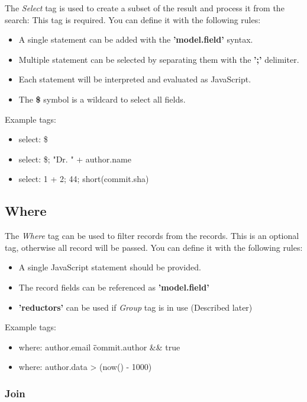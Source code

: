 The \textit{Select} tag is used to create a subset of the result and process it from the search:
This tag is required.
You can define it with the following rules:

\begin{itemize}
	\item A single statement can be added with the \textbf{'{model}.{field}'} syntax.
	\item Multiple statement can be selected by separating them with the \textbf{';'} delimiter.
	\item Each statement will be interpreted and evaluated as JavaScript.
	\item The \textbf{\$} symbol is a wildcard to select all fields. 
\end{itemize}

Example tags:
\begin{itemize}
	\item select: \$
	\item select: \$; "Dr. " + author.name
	\item select: 1 + 2; 44; short(commit.sha)
\end{itemize}

\subsection{Where}

The \textit{Where} tag can be used to filter records from the records.
This is an optional tag, otherwise all record will be passed.
You can define it with the following rules:

\begin{itemize}
	\item A single JavaScript statement should be provided.
	\item The record fields can be referenced as \textbf{'{model}.{field}'}
	\item \textbf{'reductors'} can be used if \textit{Group} tag is in use (Described later)
\end{itemize}

Example tags:
\begin{itemize}
	\item where: author.email \=\= commit.author && true
	\item where: author.data > (now() - 1000)
\end{itemize}

\subsubsection{Join}

